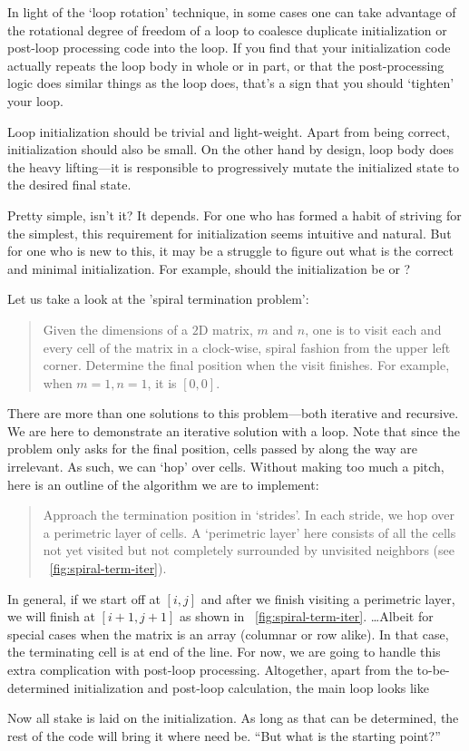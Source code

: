 In light of the `loop rotation' technique, in some cases one can take advantage of the rotational
degree of freedom of a loop to coalesce duplicate initialization
or post-loop processing code into the loop.
If you find that your initialization code actually repeats the loop body in whole or in part,
or that the post-processing logic does similar things as the loop does,
that's a sign that you should `tighten' your loop.


Loop initialization should be trivial and light-weight.
Apart from being correct, initialization should also be small.
On the other hand by design, loop body does the heavy lifting---it is responsible to progressively
mutate the initialized state to the desired final state.


Pretty simple, isn't it?
It depends.
For one who has formed a habit of striving for the simplest,
this requirement for initialization seems intuitive and natural.
But for one who is new to this, it may be a struggle
to figure out what is the correct and minimal initialization.
For example, should the initialization be  or ?


Let us take a look at the 'spiral termination problem':
\begin{quote}
    Given the dimensions of a $2$D matrix, $m$ and $n$,
    one is to visit each and every cell of the matrix in
    a clock-wise, spiral fashion from the upper left corner.
    Determine the final position when the visit finishes.
    For example, when $m=1,n=1$, it is $[0,0]$.
\end{quote}


There are more than one solutions to this problem---both iterative and recursive.
We are here to demonstrate an iterative solution with a loop.
Note that since the problem only asks for the final position,
cells passed by along the way are irrelevant.
As such, we can `hop' over cells.
Without making too much a pitch, here is an outline of the algorithm we are to implement:
\begin{quote}
    Approach the termination position in `strides'.
    In each stride, we hop over a perimetric layer of cells.
    A `perimetric layer' here consists of all the cells not yet visited but not completely
    surrounded by unvisited neighbors (see ~\autoref{fig:spiral-term-iter}).
\end{quote}


In general, if we start off at $[i,j]$ and after we finish visiting a perimetric layer,
we will finish at $[i+1,j+1]$ as shown in ~\autoref{fig:spiral-term-iter}.
\ldots Albeit for special cases when the matrix is an array (columnar or row alike).
In that case, the terminating cell is at end of the line.
For now, we are going to handle this extra complication with post-loop processing.
Altogether, apart from the to-be-determined initialization and post-loop calculation, the main loop
looks like

Now all stake is laid on the initialization.
As long as that can be determined, the rest of the
code will bring it where need be.
``But what is the starting point?''


